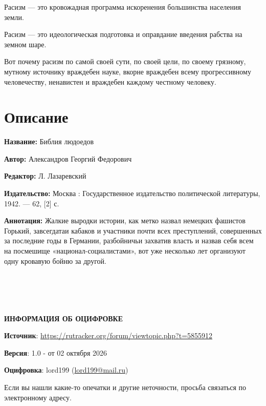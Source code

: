 \documentclass[12pt, a4paper, openany]{book}
\begin{document}
Расизм — это кровожадная программа искоренения большинства населения земли.

Расизм — это идеологическая подготовка и оправдание введения рабства на земном шаре.

Вот почему расизм по самой своей сути, по своей цели, по своему грязному, мутному источнику враждебен науке, вкорне враждебен всему прогрессивному человечеству, ненавистен и враждебен каждому честному человеку.





	
	\newpage
	\tableofcontents
	
	\thispagestyle{empty} %
	
	\newpage
	
	\setcounter{secnumdepth}{0}
	
	
		\section*{Описание}
	
	{\bf Название:} Библия людоедов
	
{\bf Автор:} Александров Георгий Федорович

{\bf Редактор:} Л. Лазаревский
	
{\bf Издательство:} Москва : Государственное издательство политической литературы, 1942. — 62, [2] с.
	
		{\bf Аннотация:} Жалкие выродки истории, как метко назвал немецких фашистов Горький, завсегдатаи кабаков и участники почти всех преступлений, совершенных за последние годы в Германии, разбойничьи захватив власть и назвав себя всем на посмешище «национал-социалистами», вот уже несколько лет организуют одну кровавую бойню за другой.
		


		\thispagestyle{empty} %


\newpage

\setcounter{secnumdepth}{0}  


\ \\
\ \\
\ \\
\ \\

\hangindent=2cm   	\textbf{ИНФОРМАЦИЯ ОБ ОЦИФРОВКЕ}

\hangindent=2cm   	\textbf{Источник}:  \href{https://rutracker.org/forum/viewtopic.php?t=5855912}{https://rutracker.org/forum/viewtopic.php?t=5855912} 

\hangindent=2cm   	\textbf{Версия}: 1.0 - от 02 октября 2026

\hangindent=2cm   	\textbf{Оцифровка}: lord199 (\href{mailto:lord199@mail.ru}{lord199@mail.ru})



\hangindent=2cm   Если вы нашли какие-то опечатки и другие неточности, просьба связаться по электронному адресу.




\thispagestyle{empty} %
	
\end{document}
